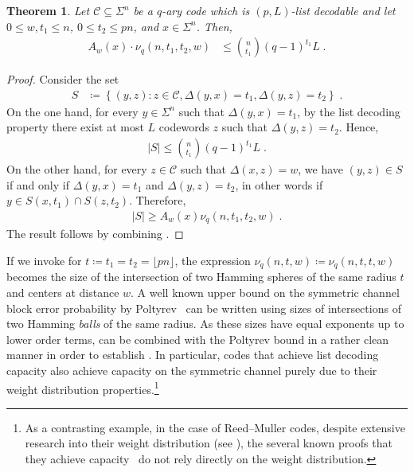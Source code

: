 \documentclass{article}
\newcommand{\cC}{\mathcal{C}}
\theoremstyle{plain}
\theoremstyle{plain}
\newtheorem{theorem}[definition]{Theorem}%
\theoremstyle{plain}
\theoremstyle{plain}
\theoremstyle{plain}
\theoremstyle{plain}
\theoremstyle{plain}
\theoremstyle{plain}
\theoremstyle{plain}
\theoremstyle{plain}
\theoremstyle{remark}
\theoremstyle{remark}
\theoremstyle{remark}
\theoremstyle{plain}
\begin{document}
\begin{theorem}
\label{thm:list-double-counting}
Let $\cC\subseteq\Sigma^n$ be a $q$-ary code which is $(p,L)$-list decodable and let $0\le w,t_1\le n$, $0\le t_2\le pn$, and $x\in\Sigma^n$. Then,
\begin{align}
    A_w(x)\cdot\nu_q(n,t_1,t_2,w)&\le 
    \binom{n}{t_1}(q-1)^{t_1}L\;.
    \label{eq:double-counting-bound}
\end{align}
\end{theorem}

\begin{proof}
Consider the set
\begin{align*}
S&\coloneqq\left\{
(y,z): z\in\cC, \Delta(y,x)=t_1, \Delta(y,z)=t_2
\right\}\;.
\end{align*}
On the one hand, for every $y\in\Sigma^n$ such
that $\Delta(y,x)=t_1$, by the list decoding property 
there exist at most $L$ codewords $z$ such that 
$\Delta(y,z)=t_2$.
Hence,
\begin{align}
\label{eq:double_count-upper}
|S|\le \binom{n}{t_1}(q-1)^{t_1} L\;.
\end{align}
On the other hand, for every $z\in\cC$ such that
$\Delta(x,z)=w$, we have $(y,z)\in S$ if and only if $\Delta(y,x)=t_1$ and $\Delta(y,z)=t_2$, in other words if
$y\in S(x,t_1)\cap S(z,t_2)$. Therefore,
\begin{align}
\label{eq:double_count-lower}
|S|\ge A_{w}(x)\nu_q(n,t_1,t_2,w)\;.
\end{align}
The result follows by combining .
\end{proof}

If we invoke 
for $t\coloneqq t_1=t_2=\lfloor pn\rfloor$, the expression
$\nu_q(n,t,w)\coloneqq
\nu_q(n,t,t,w)$ becomes the size of
the intersection of two Hamming spheres of the same
radius $t$ and centers at distance $w$.
A well known upper bound on the symmetric channel
block error probability by Poltyrev~\cite{poltyrev2002bounds, pathegama2023smoothing} can be written using
sizes of intersections of two Hamming \emph{balls} of the
same radius. As these sizes have equal exponents up to lower order terms,
 can be combined
with the Poltyrev bound in a rather clean manner
in order to establish
.
In particular, codes that achieve list decoding
capacity also achieve capacity on the symmetric channel
purely due to their weight distribution properties.\footnote{
As a contrasting example, in the case of Reed--Muller codes,
despite extensive research into their weight distribution
(see \cite{ASSY23}), the several known 
proofs
that they achieve 
capacity~\cite{kudekar2016reed,reeves2023reed,abbe2023proof,abbe2023reed,PSZ25}
do not rely 
directly on the weight distribution.
}
\end{document}
